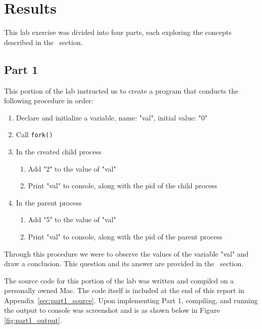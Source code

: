 
\section{Results}\label{sec:results}
    This lab exercise was divided into four parts, each exploring the concepts described in the~ section.



    \subsection{Part 1}\label{subsec:part1}
        This portion of the lab instructed us to create a program that conducts the following procedure in order:

        \begin{enumerate}
            \itemsep0em
            \item Declare and initialize a variable, name: "val", initial value: "0"
            \item Call \texttt{fork()}
            \item In the created child process
            \begin{enumerate}
                \itemsep0em
                \item Add "2" to the value of "val"
                \item Print "val" to console, along with the pid of the child process
            \end{enumerate}
            \item In the parent process
            \begin{enumerate}
                \itemsep0em
                \item Add "5" to the value of "val"
                \item Print "val" to console, along with the pid of the parent process
            \end{enumerate}
        \end{enumerate}
        Through this procedure we were to observe the values of the variable "val" and draw a conclusion.
        This question and its answer are provided in the~ section.

        \medskip
        \noindent The source code for this portion of the lab was written and compiled on a personally owned Mac.
        The code itself is included at the end of this report in Appendix~\ref{sec:part1_source}.
        Upon implementing Part 1, compiling, and running the output to console was screenshot and is as shown below in Figure \ref{fig:part1_output}.

